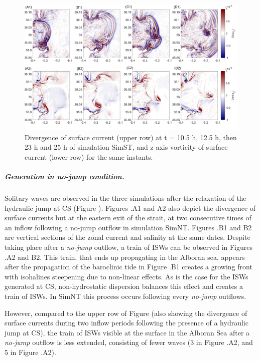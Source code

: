 \begin{figure}[!h]
 \centering
\includegraphics[width=\linewidth]{./GBR3D/FigTourbVE2.png}
 \caption [Divergence and vorticity of surface currents.]{Divergence of surface current (upper row) at t = 10.5 h, 12.5 h, then 23 h and 25 h of simulation SimST, and z-axis vorticity of surface current (lower row) for the same instants.}
 \label{FigeddGBR3D}
\end{figure}

\subparagraph{Generation in \textit{no-jump} condition.}
Solitary waves are observed in the three simulations after the relaxation of the hydraulic jump at CS (Figure ). Figures .A1 and A2 also depict the divergence of surface currents but at the eastern exit of the strait, at two consecutive times of an inflow following a no-jump outflow in simulation SimNT. Figures .B1 and B2 are vertical sections of the zonal current and salinity at the same dates. Despite taking place after a \textit{no-jump} outflow, a train of ISWs can be observed in Figures .A2 and B2. This train, that ends up propagating in the Alboran sea, appears after the propagation of the baroclinic tide in Figure .B1 creates a growing front with isohalines steepening due to non-linear effects. As is the case for the ISWs generated at CS, non-hydrostatic dispersion balances this effect and creates a train of ISWs. In SimNT this process occurs following every \textit{no-jump} outflows.

However, compared to the upper row of Figure  (also showing the divergence of surface currents during two inflow periods following the presence of a hydraulic jump at CS), the train of ISWs visible at the surface in the Alboran Sea after a \textit{no-jump} outflow is less extended, consisting of fewer waves (3 in Figure .A2, and 5 in Figure .A2).

